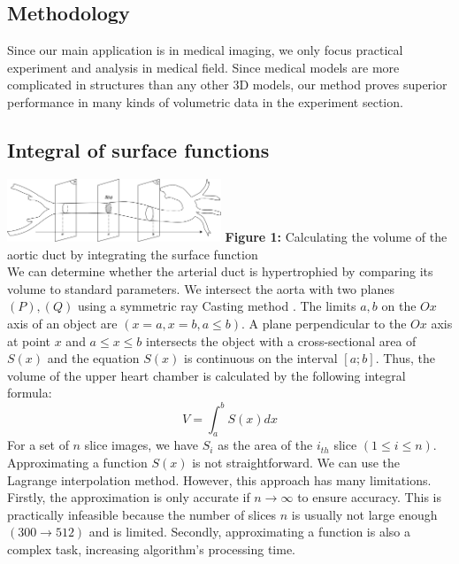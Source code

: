 \documentclass[11pt]{article}
\begin{document}
\begin{multicols}{2}
\section{Methodology}
Since our main application is in medical imaging, we only focus practical experiment and analysis in medical field. Since medical models are more complicated in structures than any other 3D models, our method proves superior performance in many kinds of volumetric data in the experiment section. 

\subsection{Integral of surface functions}

\includegraphics[width=0.48\textwidth]{Figures/Integral Surface Function.png}
\textbf{Figure 1:} Calculating the volume of the aortic duct by integrating the surface function \\

We can determine whether the arterial duct is hypertrophied by comparing its volume to standard parameters. We intersect the aorta with two planes $(P), (Q)$ using a symmetric ray Casting method \cite{vascular}. The limits $a,b$ on the $Ox$ axis of an object are $(x=a, x=b, a \leq b)$. A plane perpendicular to the $Ox$ axis at point $x$ and $a \leq x \leq b$ intersects the object with a cross-sectional area of $S(x)$ and the equation $S(x)$  is continuous on the interval $[a;b]$. Thus, the volume of the upper heart chamber is calculated by the following integral formula:
$$
V = \int_{a}^{b} S(x)dx
$$
For a set of $n$ slice images, we have $S_i$ as the area of the $i_{th}$ slice $(1 \leq i \leq n)$. Approximating a function $S(x)$ is not straightforward. We can use the Lagrange interpolation method. However, this approach has many limitations. Firstly, the approximation is only accurate if $n \rightarrow \infty$ to ensure accuracy. This is practically infeasible because the number of slices $n$ is usually not large enough $(300 \rightarrow 512)$ and is limited. Secondly, approximating a function is also a complex task, increasing algorithm's processing time.


\end{multicols}
\end{document}

